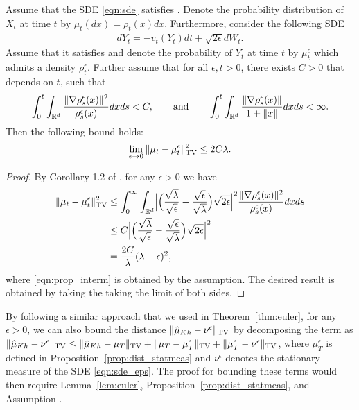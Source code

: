 \begin{prop}
\label{prop:dist_statmeas}
Assume that the SDE \eqref{eqn:sde} satisfies . Denote the probability distribution of $X_t$ at time $t$ by $\mu_t(dx) = \rho_t (x) dx$. Furthermore, consider the following SDE
\begin{align}
d Y_t = - v_t(Y_t) dt + \sqrt{2 \epsilon } d W_t. \label{eqn:sde_eps}
\end{align}
Assume that it satisfies  and denote the probability of $Y_t$ at time $t$ by $\mu^\epsilon_t$ which admits a density $\rho^\epsilon_t$. Further assume that for all $\epsilon,t>0$, there exists $C >0$ that depends on $t$, such that
\begin{align}
\int_{0}^t \int_{\mathbb{R}^d} \frac{\|\nabla \rho^\epsilon_s(x) \|^2}{\rho^\epsilon_s(x)} dx ds <C, \qquad \text{and} \qquad \int_{0}^t \int_{\mathbb{R}^d}  \frac{\|\nabla \rho^\epsilon_s(x)\|}{1+\|x\|} dx ds <\infty.
\end{align}
Then the following bound holds:
\begin{align}
\lim_{\epsilon \rightarrow 0} \| \mu_t - \mu^\epsilon_t \|_{\textnormal{TV}}^2 \leq 2 C \lambda.
\end{align}
\end{prop}
%
\begin{proof}
By Corollary 1.2 of \cite{bogachev2016distances}, for any $\epsilon > 0$ we have 
\begin{align}
\| \mu_t - \mu_t^\epsilon \|_{\textnormal{TV}}^2 &\leq \int_0^\infty \int_{\mathbb{R}^d} \Bigl| \Bigl(\frac{\sqrt{\lambda}}{\sqrt{\epsilon}}- \frac{\sqrt{\epsilon}}{\sqrt{\lambda}} \Bigr) \sqrt{2\epsilon}  \Bigr|^2 \frac{\|\nabla \rho^\epsilon_s(x)\|^2}{\rho^\epsilon_s(x)}  dx ds \\
&\leq  C \Bigl| \Bigl(\frac{\sqrt{\lambda}}{\sqrt{\epsilon}}- \frac{\sqrt{\epsilon}}{\sqrt{\lambda}} \Bigr) \sqrt{2\epsilon}  \Bigr|^2 \label{eqn:prop_interm} \\
&= \frac{2C}{\lambda} (\lambda - \epsilon)^2,
\end{align}
where \eqref{eqn:prop_interm} is obtained by the assumption. The desired result is obtained by taking the taking the limit of both sides. 
\end{proof}
%

\begin{remark}
By following a similar approach that we used in Theorem~\ref{thm:euler}, for any $\epsilon > 0$, we can also bound the distance $\|\hat{\mu}_{Kh} - \nu^\epsilon\|_{\textnormal{TV}}$ by decomposing the term as $\|\hat{\mu}_{Kh} - \nu^\epsilon\|_{\textnormal{TV}} \leq \|\hat{\mu}_{Kh} - \mu_T\|_{\textnormal{TV}} + \| \mu_T - \mu_T^\epsilon\|_{\textnormal{TV}} + \|\mu_T^\epsilon - \nu^\epsilon \|_{\textnormal{TV}}$, where $\mu_T^\epsilon$ is defined in Proposition~\ref{prop:dist_statmeas} and $\nu^\epsilon$ denotes the stationary measure of the SDE \eqref{eqn:sde_eps}. The proof for bounding these terms would then require Lemma~\ref{lem:euler}, Proposition~\ref{prop:dist_statmeas}, and Assumption . %
\end{remark} 



